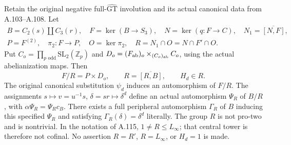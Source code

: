 Retain the original negative full-\(\widehat{\mathrm{GT}}\) involution and
its actual canonical data from A.103--A.108. Let
\[
 \begin{gathered}
 B=C_2(s)\amalg C_3(r),\quad F=\ker(B\to S_3),\quad
 N=\ker(q:F\to C),\quad N_1=\overline{[N,F]},\\
 P=F^{(2)},\quad \pi_2:F\to P,\quad O=\ker\pi_2,\quad
 R=N_1\cap O=N\cap F'\cap O.
 \end{gathered}                                                   \tag{A.116.1}
\]
Put \(C_o=\prod_{p\text{ odd}}\mathrm{SL}_2(\mathbb Z_p)\) and
\(D_o=(F_{\rm ab})_o\times_{(C_o)_{\rm ab}}C_o\), using the actual
abelianization maps. Then
\[
 \boxed{F/R=P\times D_o,\qquad R=\overline{[R,B]},\qquad H_d\in R.}
                                                                  \tag{A.116.2}
\]
The original canonical substitution \(\psi_d\) induces an automorphism
of \(F/R\). The assignments \(s\mapsto v=u^{-1}s\),
\(\delta=sr\mapsto\delta^d\) define an actual automorphism
\(\Psi_R\) of \(B/R\), with \(\alpha\Psi_R=\Psi_Rc_B\).
There exists a full peripheral automorphism \(\Gamma_R\) of \(B\)
inducing this specified \(\Psi_R\) and satisfying
\(\Gamma_R(\delta)=\delta^d\) literally.
The group \(R\) is not pro-two and is nontrivial. In the notation of
A.115, \(1\ne R\le L_\infty\); that central tower is therefore not
cofinal. No assertion \(R=R'\), \(R=L_\infty\), or \(H_d=1\) is made.

